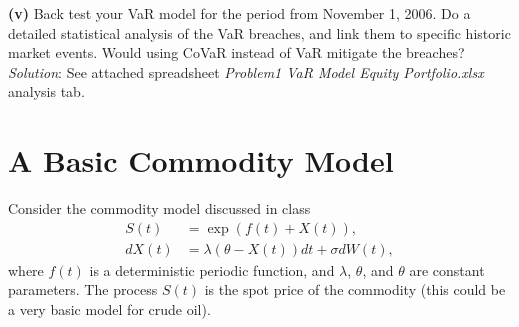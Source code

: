 \documentclass[paper=a4, fontsize=11pt]{scrartcl} %
\numberwithin{equation}{section} %
\numberwithin{figure}{section} %
\numberwithin{table}{section} %
\begin{document}
\textbf{(v)} Back test your VaR model for the period from November 1, 2006. Do
a detailed statistical analysis of the VaR breaches, and link them to
specific historic market events. Would using CoVaR instead of VaR
mitigate the breaches?
 \textit{Solution}: See attached spreadsheet \textit{Problem1 VaR Model Equity Portfolio.xlsx} analysis tab.\\

\newpage

\section{A Basic Commodity Model}
Consider the commodity model discussed in class
\begin{align*}
S(t) &= \exp\left( f(t) + X(t) \right),\\
dX(t) &= \lambda\left(\theta - X(t)\right)dt + \sigma dW(t),
\end{align*}
where $f(t)$ is a deterministic periodic function, and $\lambda$, $\theta$, and $\theta$ are
constant parameters. The process $S(t)$ is the spot price of the commodity (this could be a very
basic model for crude oil).\\
\end{document}
